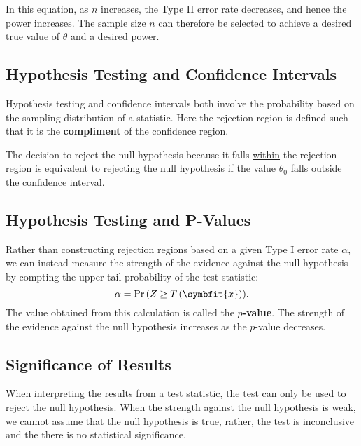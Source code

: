 \documentclass{article}
\begin{document}
In this equation, as \(n\) increases, the Type II error rate decreases, and hence the power increases.
The sample size \(n\) can therefore be selected to achieve a desired true value of \(\theta\) and a desired power.
\subsection{Hypothesis Testing and Confidence Intervals}
Hypothesis testing and confidence intervals both involve the probability based on the sampling distribution of a statistic.
Here the rejection region is defined such that it is the \textbf{compliment} of the confidence region.

The decision to reject the null hypothesis because it falls \underline{within} the rejection region is equivalent to
rejecting the null hypothesis if the value \(\theta_0\) falls \underline{outside} the confidence interval.
\subsection{Hypothesis Testing and P-Values}
Rather than constructing rejection regions based on a given Type I error rate \(\alpha\), we
can instead measure the strength of the evidence against the null hypothesis by compting the
upper tail probability of the test statistic:
\begin{equation*}
    \alpha = \Pr{\left( Z \geq T\left( \symbfit{x} \right) \right)}.
\end{equation*}
The value obtained from this calculation is called the \textbf{\(p\)-value}.
The strength of the evidence against the null hypothesis increases as the \(p\)-value decreases.
\subsection{Significance of Results}
When interpreting the results from a test statistic, the test can only be used to reject the null hypothesis.
When the strength against the null hypothesis is weak, we cannot assume that the null hypothesis is true,
rather, the test is inconclusive and the there is no statistical significance.
\end{document}

